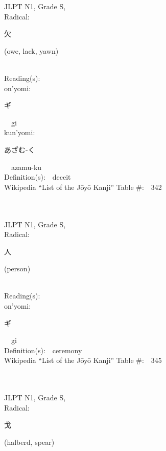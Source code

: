 \begin{multicols}{2}
{JLPT N1, Grade S, \\Radical:\ \ {\begin{CJK}{UTF8}{min} 欠 \end{CJK}} (owe, lack, yawn) } \\
Reading(s):\ \ \\
{\hspace*{1em}}on'yomi:\ \ \\
{\hspace*{2em}}{\begin{CJK}{UTF8}{min} ギ \end{CJK}}\ \ gi\ \ \\
{\hspace*{1em}}kun'yomi:\ \ \\
{\hspace*{2em}}{\begin{CJK}{UTF8}{min} あざむ-く \end{CJK}}\ \ azamu-ku\ \ \\
Definition(s):\ \ deceit \\
Wikipedia ``List of the J\=oy\=o Kanji'' Table \#:\ \ 342 \\
\ \ \\
{\fontsize{34pt}{40pt}  }\ \ \\
{JLPT N1, Grade S, \\Radical:\ \ {\begin{CJK}{UTF8}{min} 人 \end{CJK}} (person) } \\
Reading(s):\ \ \\
{\hspace*{1em}}on'yomi:\ \ \\
{\hspace*{2em}}{\begin{CJK}{UTF8}{min} ギ \end{CJK}}\ \ gi\ \ \\
Definition(s):\ \ ceremony \\
Wikipedia ``List of the J\=oy\=o Kanji'' Table \#:\ \ 345 \\
\ \ \\
{\fontsize{34pt}{40pt}  }\ \ \\
{JLPT N1, Grade S, \\Radical:\ \ {\begin{CJK}{UTF8}{min} 戈 \end{CJK}} (halberd, spear) } \\

\end{multicols}
